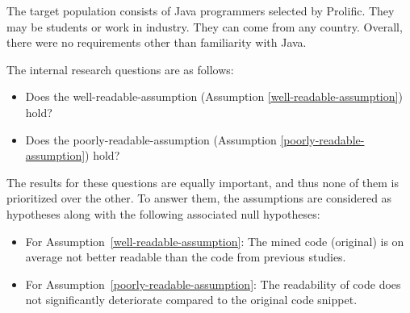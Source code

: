 \documentclass[%
class=scrreprt,
chapterprefix=false,%
open=right,%
twoside=false,%
paper=a4,%
logofile={Logo\_zentral\_farbig\_EN.png},%
thesistype=master,%
UKenglish,%
]{se2thesis}
\theoremstyle{definition}
\begin{document}
	The target population consists of Java programmers selected by Prolific. They may be students or work in industry. They can come from any country. Overall, there were no requirements other than familiarity with Java.
	
	
	The internal research questions are as follows:
	\begin{itemize}
		\item Does the well-readable-assumption (Assumption \ref{well-readable-assumption}) hold?
		\item Does the poorly-readable-assumption (Assumption \ref{poorly-readable-assumption}) hold?
	\end{itemize}
	
	The results for these questions are equally important, and thus none of them is prioritized over the other.
	To answer them, the assumptions	are considered as hypotheses along with the following associated null hypotheses:
	\begin{itemize}
		\item For Assumption~\ref{well-readable-assumption}: The mined code (original) is on average not better readable than the code from previous studies.
		\item For Assumption~\ref{poorly-readable-assumption}: The readability of code does not significantly deteriorate compared to the original code snippet.
	\end{itemize}
	
\end{document}
